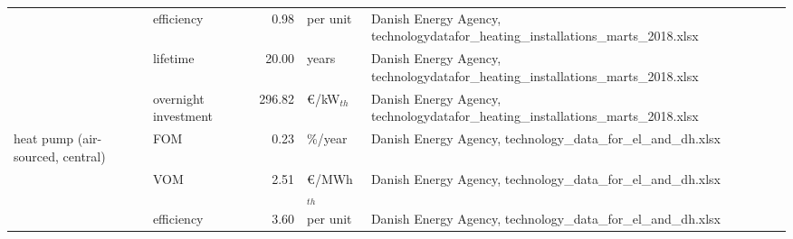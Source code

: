 \begin{longtable}{p{4cm}p{4cm}rp{3cm}p{10cm}}
                      & efficiency &         0.98 &                      per unit &                                                                                                                                                                                                                                                    Danish Energy Agency, technologydatafor\_heating\_installations\_marts\_2018.xlsx \\
                      & lifetime &        20.00 &                         years &                                                                                                                                                                                                                                                    Danish Energy Agency, technologydatafor\_heating\_installations\_marts\_2018.xlsx \\
                      & overnight investment &       296.82 &               \euro/kW$_{th}$ &                                                                                                                                                                                                                                                    Danish Energy Agency, technologydatafor\_heating\_installations\_marts\_2018.xlsx \\
heat pump (air-sourced, central) & FOM &         0.23 &                       \%/year &                                                                                                                                                                                                                                                                        Danish Energy Agency, technology\_data\_for\_el\_and\_dh.xlsx \\
                      & VOM &         2.51 &              \euro/MWh$_{th}$ &                                                                                                                                                                                                                                                                        Danish Energy Agency, technology\_data\_for\_el\_and\_dh.xlsx \\
                      & efficiency &         3.60 &                      per unit &                                                                                                                                                                                                                                                                        Danish Energy Agency, technology\_data\_for\_el\_and\_dh.xlsx \\

\end{longtable}

